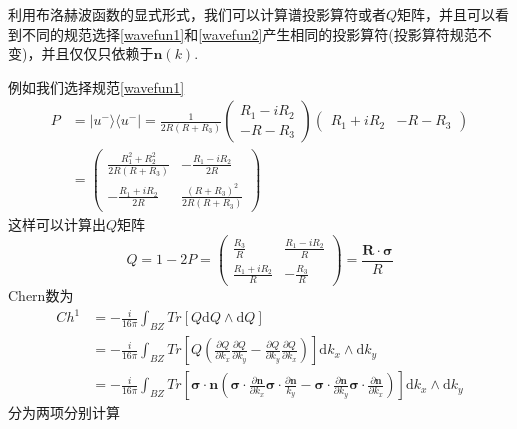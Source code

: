 \documentclass[a4paper]{article}
\numberwithin{equation}{subsection}
\begin{document}
利用布洛赫波函数的显式形式，我们可以计算谱投影算符或者$Q$矩阵，并且可以看到不同的规范选择\eqref{wavefun1}和\eqref{wavefun2}产生相同的投影算符(投影算符规范不变)，并且仅仅只依赖于$\mathbf{n}(k)$.

例如我们选择规范\eqref{wavefun1}
\begin{equation*}
    \begin{split}
        P&=|u^-\rangle\langle u^-|=\frac{1}{2R(R+R_3)}\begin{pmatrix}
            R_1-iR_2\\
            -R-R_3
        \end{pmatrix}\begin{pmatrix}
            R_1+iR_2&-R-R_3
        \end{pmatrix}\\
        &=\begin{pmatrix}
            \frac{R_1^2+R_2^2}{2R(R+R_3)}&-\frac{R_1-iR_2}{2R}\\
            -\frac{R_1+iR_2}{2R}&\frac{(R+R_3)^2}{2R(R+R_3)}
        \end{pmatrix}
    \end{split}
\end{equation*}
这样可以计算出$Q$矩阵
\begin{equation}
    Q=1-2P=\begin{pmatrix}
        \frac{R_3}{R}&\frac{R_1-iR_2}{R}\\
        \frac{R_1+iR_2}{R}&-\frac{R_3}{R}
    \end{pmatrix}=\frac{\mathbf{R}\cdot \bm{\sigma}}{R}
\end{equation}
Chern数为
\begin{equation*}
    \begin{split}
        Ch^1&=-\frac{i}{16\pi}\int_{BZ}Tr[Q\mathrm{d}Q\wedge \mathrm{d}Q]\\
        &=-\frac{i}{16\pi}\int_{BZ}Tr[Q(\frac{\partial Q}{\partial k_x}\frac{\partial Q}{\partial k_y}-\frac{\partial Q}{\partial k_y}\frac{\partial Q}{\partial k_x})]\mathrm{d}k_x\wedge \mathrm{d}k_y\\
        &=-\frac{i}{16\pi}\int_{BZ}Tr[\bm{\sigma}\cdot\mathbf{n}(\bm{\sigma}\cdot\frac{\partial\mathbf{n}}{\partial k_x}\bm{\sigma}\cdot\frac{\partial\mathbf{n}}{k_y}-\bm{\sigma}\cdot\frac{\partial\mathbf{n}}{\partial k_y}\bm{\sigma}\cdot\frac{\partial\bm{n}}{\partial k_x})]\mathrm{d}k_x\wedge\mathrm{d}k_y
    \end{split}
\end{equation*}
分为两项分别计算
\end{document}
